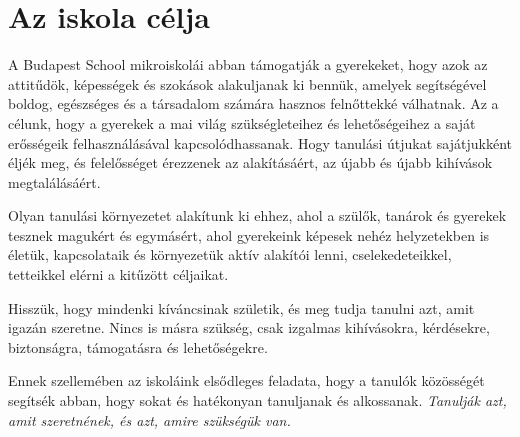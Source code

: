 \section{Az iskola célja}
\label{sec:iskola_celja}

A Budapest School mikroiskolái abban támogatják a gyerekeket, hogy azok az
attitűdök, képességek és szokások alakuljanak ki bennük, amelyek segítségével
boldog, egészséges és a társadalom számára hasznos felnőttekké válhatnak. Az a
célunk, hogy a gyerekek a mai világ szükségleteihez és lehetőségeihez a saját
erősségeik felhasználásával kapcsolódhassanak.	Hogy tanulási útjukat
sajátjukként éljék meg, és felelősséget érezzenek az alakításáért, az újabb és
újabb kihívások megtalálásáért.

Olyan tanulási környezetet alakítunk ki ehhez, ahol a szülők, tanárok és
gyerekek tesznek magukért és egymásért, ahol gyerekeink képesek nehéz
helyzetekben is életük, kapcsolataik és környezetük aktív alakítói lenni,
cselekedeteikkel, tetteikkel elérni a kitűzött céljaikat.

Hisszük, hogy mindenki kíváncsinak születik, és meg tudja tanulni azt, amit
igazán szeretne. Nincs is másra szükség, csak izgalmas kihívásokra, kérdésekre,
biztonságra, támogatásra és lehetőségekre.

Ennek szellemében az iskoláink elsődleges feladata, hogy a tanulók közösségét
segítsék abban, hogy sokat és hatékonyan tanuljanak és alkossanak.
\emph{Tanulják azt, amit szeretnének, és azt, amire szükségük van.}
